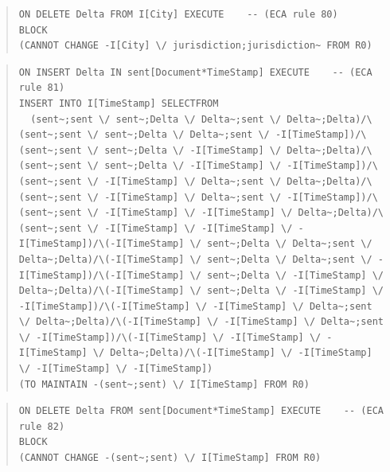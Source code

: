 \documentclass[10pt,a4paper]{report}              %
\theoremstyle{plain}\theorembodyfont{\rmfamily}\newtheorem{definition}{Definition}[section]
\theoremstyle{plain}\theorembodyfont{\rmfamily}\newtheorem{designrule}[definition]{Requirement}
\begin{document}
\begin{quote}
\begin{verbatim}
ON DELETE Delta FROM I[City] EXECUTE    -- (ECA rule 80)
BLOCK
(CANNOT CHANGE -I[City] \/ jurisdiction;jurisdiction~ FROM R0)
\end{verbatim}
\end{quote}
\begin{quote}
\begin{verbatim}
ON INSERT Delta IN sent[Document*TimeStamp] EXECUTE    -- (ECA rule 81)
INSERT INTO I[TimeStamp] SELECTFROM
  (sent~;sent \/ sent~;Delta \/ Delta~;sent \/ Delta~;Delta)/\(sent~;sent \/ sent~;Delta \/ Delta~;sent \/ -I[TimeStamp])/\(sent~;sent \/ sent~;Delta \/ -I[TimeStamp] \/ Delta~;Delta)/\(sent~;sent \/ sent~;Delta \/ -I[TimeStamp] \/ -I[TimeStamp])/\(sent~;sent \/ -I[TimeStamp] \/ Delta~;sent \/ Delta~;Delta)/\(sent~;sent \/ -I[TimeStamp] \/ Delta~;sent \/ -I[TimeStamp])/\(sent~;sent \/ -I[TimeStamp] \/ -I[TimeStamp] \/ Delta~;Delta)/\(sent~;sent \/ -I[TimeStamp] \/ -I[TimeStamp] \/ -I[TimeStamp])/\(-I[TimeStamp] \/ sent~;Delta \/ Delta~;sent \/ Delta~;Delta)/\(-I[TimeStamp] \/ sent~;Delta \/ Delta~;sent \/ -I[TimeStamp])/\(-I[TimeStamp] \/ sent~;Delta \/ -I[TimeStamp] \/ Delta~;Delta)/\(-I[TimeStamp] \/ sent~;Delta \/ -I[TimeStamp] \/ -I[TimeStamp])/\(-I[TimeStamp] \/ -I[TimeStamp] \/ Delta~;sent \/ Delta~;Delta)/\(-I[TimeStamp] \/ -I[TimeStamp] \/ Delta~;sent \/ -I[TimeStamp])/\(-I[TimeStamp] \/ -I[TimeStamp] \/ -I[TimeStamp] \/ Delta~;Delta)/\(-I[TimeStamp] \/ -I[TimeStamp] \/ -I[TimeStamp] \/ -I[TimeStamp])
(TO MAINTAIN -(sent~;sent) \/ I[TimeStamp] FROM R0)
\end{verbatim}
\end{quote}
\begin{quote}
\begin{verbatim}
ON DELETE Delta FROM sent[Document*TimeStamp] EXECUTE    -- (ECA rule 82)
BLOCK
(CANNOT CHANGE -(sent~;sent) \/ I[TimeStamp] FROM R0)
\end{verbatim}
\end{quote}
\end{document}
